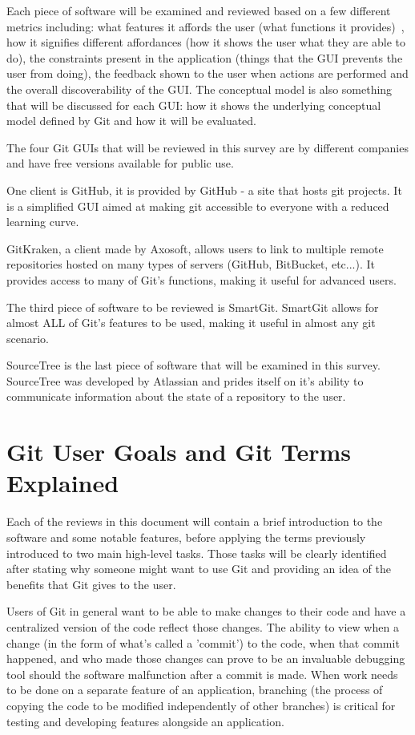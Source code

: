 \documentclass{sigchi}
\begin{document}
 Each piece of software will be examined and reviewed based on a few different metrics including: what features it affords the 
user (what functions it provides)~\cite{Norman:2013}, how it signifies different affordances (how it shows
the user what they are able to do), the constraints present in the application
(things that the GUI prevents the user from doing), the feedback shown to the 
user when actions are performed and the overall discoverability of the GUI.
The conceptual model is also something that will be discussed for each GUI: how
it shows the underlying conceptual model defined by Git and how it will be evaluated.

The four Git GUIs that will be reviewed in this survey are by different companies and have
free versions available for public use. 

One client is GitHub, it is provided by GitHub - a site that hosts git projects. It is a simplified GUI aimed at making git accessible to everyone
with a  reduced learning curve.

GitKraken, a client made by Axosoft, allows users to link to multiple remote repositories hosted on many types of servers (GitHub, BitBucket, etc...).
It provides access to many of Git's functions, making it useful for advanced users.

The third piece of software to be reviewed is SmartGit. SmartGit allows for almost ALL of Git's
features to be used, making it useful in almost any git scenario. 

SourceTree is the last piece of software that will be examined in this survey. SourceTree was developed by Atlassian and
prides itself on it's ability to communicate information about the state of a repository to the user.

\section{Git User Goals and Git Terms Explained}
Each of the reviews in this document will contain a brief introduction to the software and some notable features, before applying 
the terms previously introduced to two main high-level tasks. Those tasks will be clearly identified 
after stating why someone might want to use Git and providing an idea of the benefits that Git gives to the user.

Users of Git in general want to be able to make changes to their code and have a centralized version of the code reflect those changes. 
The ability to view when a change (in the form of what's called a 'commit') to the code, when that
commit happened, and who made those changes can prove to be an invaluable debugging tool
should the software malfunction after a commit is made. When work needs to be done on a 
separate feature of an application, branching (the process of copying the code to be modified
independently of other branches) is critical for testing and developing features alongside an application.
\end{document}
